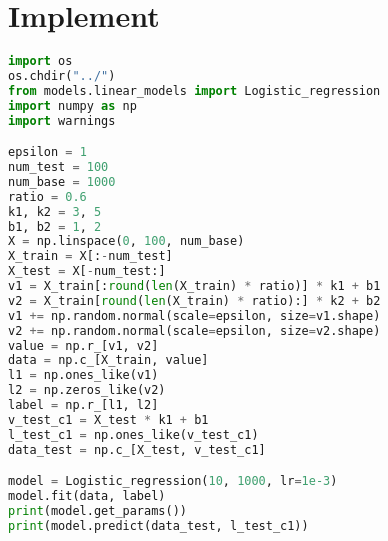 \documentclass{report}
\begin{document}
\section{Implement}
\begin{lstlisting}[language={python}]
import os
os.chdir("../")
from models.linear_models import Logistic_regression
import numpy as np
import warnings

epsilon = 1
num_test = 100
num_base = 1000
ratio = 0.6
k1, k2 = 3, 5
b1, b2 = 1, 2
X = np.linspace(0, 100, num_base)
X_train = X[:-num_test]
X_test = X[-num_test:]
v1 = X_train[:round(len(X_train) * ratio)] * k1 + b1
v2 = X_train[round(len(X_train) * ratio):] * k2 + b2
v1 += np.random.normal(scale=epsilon, size=v1.shape)
v2 += np.random.normal(scale=epsilon, size=v2.shape)
value = np.r_[v1, v2]
data = np.c_[X_train, value]
l1 = np.ones_like(v1)
l2 = np.zeros_like(v2)
label = np.r_[l1, l2]
v_test_c1 = X_test * k1 + b1
l_test_c1 = np.ones_like(v_test_c1)
data_test = np.c_[X_test, v_test_c1]

model = Logistic_regression(10, 1000, lr=1e-3)
model.fit(data, label)
print(model.get_params())
print(model.predict(data_test, l_test_c1))
\end{lstlisting}
\end{document}
